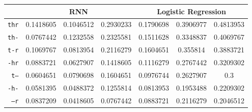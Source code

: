 \documentclass[../main.tex]{subfiles}
\begin{document}
\begin{table}[ht]
\begin{small}
\begin{tabular}{|r|c|c|c|c|c|c|}
		\hline
		 & \multicolumn{3}{|c|}{\textbf{RNN}} & \multicolumn{3}{|c|}{\textbf{Logistic Regression}} \\
		\hline
		\texttt{thr} & 0.1418605 & 0.1046512 & 0.2930233 & 0.1790698 & 0.3906977 & 0.4813953 \\
		\texttt{th-} & 0.0767442 & 0.1232558 & 0.2325581 & 0.1511628 & 0.3348837 & 0.4069767 \\
		\texttt{t-r} & 0.1069767 & 0.0813954 & 0.2116279 & 0.1604651 & 0.355814 & 0.3883721 \\
		\texttt{-hr} & 0.0883721 & 0.0627907 & 0.1418605 & 0.1116279 & 0.2767442 & 0.3209302 \\
		\texttt{t--} & 0.0604651 & 0.0790698 & 0.1604651 & 0.0976744 & 0.2627907 & 0.3 \\
		\texttt{-h-} & 0.0581395 & 0.0488372 & 0.1255814 & 0.0813953 & 0.1953488 & 0.2209302 \\
		\texttt{--r} & 0.0837209 & 0.0418605 & 0.0767442 & 0.0883721 & 0.2116279 & 0.2046512 \\
		\hline
	\end{tabular}
	\end{small}
\end{table}
\end{document}
